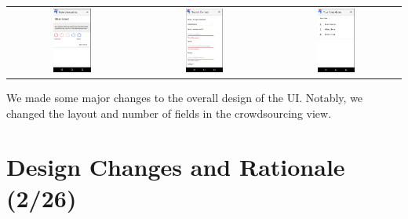 \documentclass[11pt]{article}
\begin{document}
\begin{tabular}{ccc}
    \includegraphics[width = 0.31\textwidth]{1.jpg}
    &
    \includegraphics[width = 0.31\textwidth]{2.jpg}
    &
    \includegraphics[width = 0.31\textwidth]{3.jpg}
\end{tabular}

We made some major changes to the overall design of the UI. Notably, we changed the layout and number of fields in the crowdsourcing view.

\section{Design Changes and Rationale (2/26)}
\end{document}
